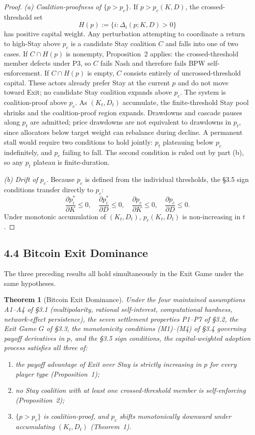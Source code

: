 \documentclass[12pt]{article}
\newtheorem{theorem}{Theorem}
\theoremstyle{definition}
\theoremstyle{remark}
\begin{document}
\begin{proof}
\emph{(a) Coalition-proofness of $\{p > p_c\}$.} If $p > p_c(K, D)$, the crossed-threshold set
\[
H(p) := \{i : \Delta_i(p; K, D) > 0\}
\]
has positive capital weight. Any perturbation attempting to coordinate
a return to high-Stay above $p_c$ is a candidate Stay coalition
$C$ and falls into one of two cases. If $C \cap H(p)$ is
nonempty, Proposition~2 applies: the crossed-threshold member
defects under P3, so $C$ fails Nash and therefore fails BPW
self-enforcement. If $C \cap H(p)$
is empty, $C$ consists entirely of uncrossed-threshold capital. These actors already prefer Stay at the current $p$ and do not move toward Exit; no candidate Stay coalition expands above $p_c$.
The system is coalition-proof above $p_c$. As $(K_t, D_t)$ accumulate, the finite-threshold Stay pool shrinks and the coalition-proof region expands. Drawdowns and cascade pauses along $p_t$ are admitted; price drawdowns are not equivalent to drawdowns in $p_t$, since allocators below target weight can rebalance during decline. A permanent stall would require two conditions to hold jointly: $p_t$ plateauing below $p_c$ indefinitely, and $p_c$ failing to fall. The second condition is ruled out by part (b), so any $p_t$ plateau is finite-duration.

\emph{(b) Drift of $p_c$.} Because $p_c$ is defined from the individual thresholds, the \S3.5 sign conditions transfer directly to $p_c$:
\[
\frac{\partial p_i^*}{\partial K} \leq 0, \quad \frac{\partial p_i^*}{\partial D} \leq 0, \quad \frac{\partial p_c}{\partial K} \leq 0, \quad \frac{\partial p_c}{\partial D} \leq 0.
\]
Under monotonic accumulation of $(K_t, D_t)$, $p_c(K_t, D_t)$ is non-increasing in $t$.
\end{proof}

\subsection{4.4 Bitcoin Exit Dominance}

The three preceding results all hold simultaneously in the Exit Game under the same hypotheses.

\begin{theorem}[Bitcoin Exit Dominance]
Under the four maintained assumptions A1--A4 of \S3.1 (multipolarity,
rational self-interest, computational hardness, network-effect
persistence), the seven settlement properties P1--P7 of \S3.2, the
Exit Game $G$ of \S3.3, the monotonicity conditions (M1)--(M4) of
\S3.4 governing payoff derivatives in $p$, and the \S3.5 sign
conditions, the capital-weighted adoption process satisfies all three of:
\begin{enumerate}[label=(\roman*),nosep]
\item the payoff advantage of Exit over Stay is strictly increasing
in $p$ for every player type (Proposition~1);
\item no Stay coalition with at least one crossed-threshold
member is self-enforcing (Proposition~2);
\item $\{p > p_c\}$ is coalition-proof, and $p_c$ shifts monotonically downward under accumulating $(K_t, D_t)$ (Theorem~1).
\end{enumerate}
\end{theorem}
\end{document}
